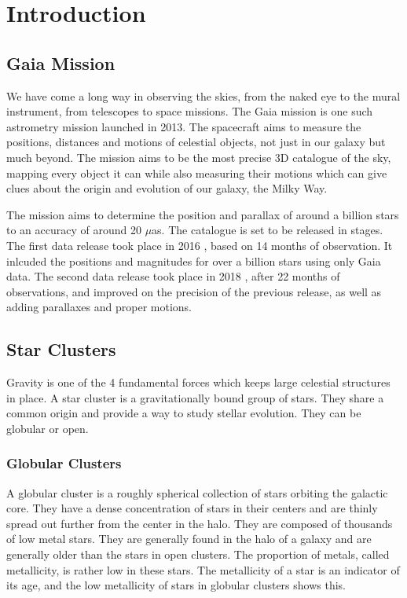 \chapter{Introduction}\label{ch:ch1}

\section{Gaia Mission}
We have come a long way in observing the skies, from the naked eye to the mural instrument, from telescopes to space missions. The Gaia mission \citep{gaia} \citep{gaiafaccs} is one such astrometry mission launched in 2013. The spacecraft aims to measure the positions, distances and motions of celestial objects, not just in our galaxy but much beyond. The mission aims to be the most precise 3D catalogue of the sky, mapping every object it can while also measuring their motions which can give clues about the origin and evolution of our galaxy, the Milky Way.

The mission aims to determine the position and parallax of around a billion stars to an accuracy of around 20 $\mu$as. The catalogue is set to be released in stages. The first data release took place in 2016 \citep{gaiadr1}, based on 14 months of observation. It inlcuded the positions and magnitudes for over a billion stars using only Gaia data. The second data release took place in 2018 \citep{gaiadr2}, after 22 months of observations, and improved on the precision of the previous release, as well as adding parallaxes and proper motions.

\section{Star Clusters}
Gravity is one of the 4 fundamental forces which keeps large celestial structures in place. A star cluster is a gravitationally bound group of stars. They share a common origin and provide a way to study stellar evolution. They can be globular or open.

\subsection{Globular Clusters}
A globular cluster is a roughly spherical collection of stars orbiting the galactic core. They have a dense concentration of stars in their centers and are thinly spread out further from the center in the halo. They are composed of thousands of low metal stars. They are generally found in the halo of a galaxy and are generally older than the stars in open clusters. \citep{globclust} The proportion of metals, called metallicity, is rather low in these stars. The metallicity of a star is an indicator of its age, and the low metallicity of stars in globular clusters shows this. \citep{introstars}

